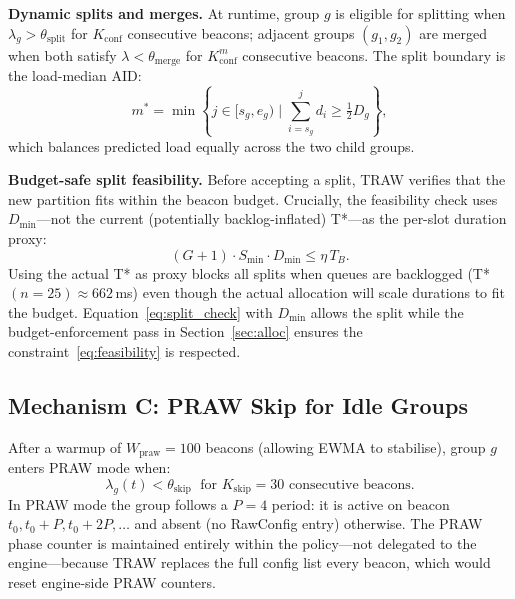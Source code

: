 \documentclass[conference]{IEEEtran}
\begin{document}
\textbf{Dynamic splits and merges.}
At runtime, group $g$ is eligible for splitting when
$\lambda_g\!>\!\theta_\mathrm{split}$ for $K_\mathrm{conf}$
consecutive beacons; adjacent groups $(g_1,g_2)$ are merged when
both satisfy $\lambda\!<\!\theta_\mathrm{merge}$ for $K_\mathrm{conf}^m$
consecutive beacons.
The split boundary is the load-median AID:
\begin{equation}
  m^* = \min\!\left\{j \in [s_g,e_g)\;\Big|\;\sum_{i=s_g}^{j}d_i \geq
    \tfrac{1}{2}D_g\right\},
  \label{eq:split_mid}
\end{equation}
which balances predicted load equally across the two child groups.

\textbf{Budget-safe split feasibility.}\label{sec:budget_fix}
Before accepting a split, TRAW verifies that the new partition fits
within the beacon budget.
Crucially, the feasibility check uses $D_\mathrm{min}$---not the
current (potentially backlog-inflated) T*---as the per-slot duration
proxy:
\begin{equation}
  (G+1)\cdot S_\mathrm{min}\cdot D_\mathrm{min} \leq \eta\,T_B.
  \label{eq:split_check}
\end{equation}
Using the actual T* as proxy blocks all splits when queues are
backlogged (T*$(n\!=\!25)\!\approx\!662$\,ms) even though the actual
allocation will scale durations to fit the budget.
Equation~\eqref{eq:split_check} with $D_\mathrm{min}$ allows the
split while the budget-enforcement pass in Section~\ref{sec:alloc}
ensures the constraint~\eqref{eq:feasibility} is respected.

\subsection{Mechanism C: PRAW Skip for Idle Groups}
\label{sec:praw}

After a warmup of $W_\mathrm{praw}\!=\!100$ beacons (allowing EWMA to
stabilise), group $g$ enters PRAW mode when:
\begin{equation}
  \lambda_g(t) < \theta_\mathrm{skip} \;\text{ for }
  K_\mathrm{skip}\!=\!30 \text{ consecutive beacons.}
  \label{eq:praw_enter}
\end{equation}
In PRAW mode the group follows a $P\!=\!4$ period: it is active on
beacon $t_0, t_0+P, t_0+2P,\ldots$ and absent (no RawConfig entry)
otherwise.
The PRAW phase counter is maintained entirely within the policy---not
delegated to the engine---because TRAW replaces the full config list
every beacon, which would reset engine-side PRAW counters.
\end{document}
